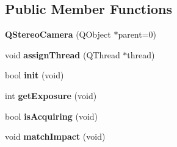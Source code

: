 \subsection*{Public Member Functions}
\begin{DoxyCompactItemize}
\item 
\hypertarget{class_q_stereo_camera_a9fc87c0fb63f5f1dc051bef6d0e1718b}{}{\bfseries Q\+Stereo\+Camera} (Q\+Object $\ast$parent=0)\label{class_q_stereo_camera_a9fc87c0fb63f5f1dc051bef6d0e1718b}

\item 
\hypertarget{class_q_stereo_camera_a7a74b825ee958be9130990fdd3165b02}{}void {\bfseries assign\+Thread} (Q\+Thread $\ast$thread)\label{class_q_stereo_camera_a7a74b825ee958be9130990fdd3165b02}

\item 
\hypertarget{class_q_stereo_camera_a1c604e29157167d67f6a80b50f5e2d3e}{}bool {\bfseries init} (void)\label{class_q_stereo_camera_a1c604e29157167d67f6a80b50f5e2d3e}

\item 
\hypertarget{class_q_stereo_camera_abce4b7d10c518ef49a989c28ea9a18f7}{}int {\bfseries get\+Exposure} (void)\label{class_q_stereo_camera_abce4b7d10c518ef49a989c28ea9a18f7}

\item 
\hypertarget{class_q_stereo_camera_a074b6b7b89d1ae0405a25e6e5ceabc0a}{}bool {\bfseries is\+Acquiring} (void)\label{class_q_stereo_camera_a074b6b7b89d1ae0405a25e6e5ceabc0a}

\item 
\hypertarget{class_q_stereo_camera_aca3c6fa7d94024cbc761782aac469541}{}void {\bfseries match\+Impact} (void)\label{class_q_stereo_camera_aca3c6fa7d94024cbc761782aac469541}

\end{DoxyCompactItemize}
